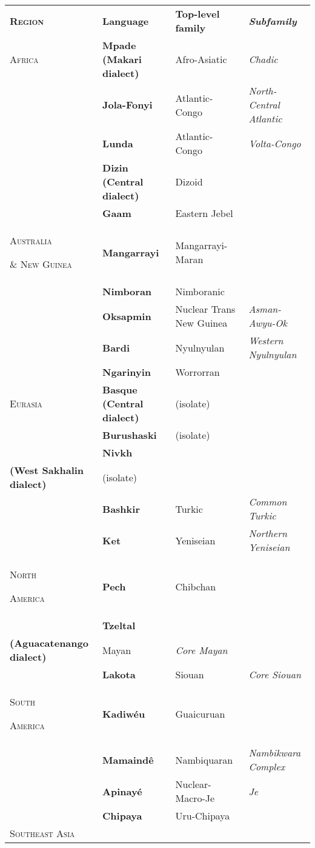 \begin{table}
\begin{tabularx}{\textwidth}{XXXX}
\lsptoprule

\textbf{\textsc{Region}} & \textbf{Language} & \textbf{Top-level family} & \textbf{\textit{Subfamily}}\\
\textsc{Africa} & \textbf{Mpade (Makari dialect)} & Afro-Asiatic & \textit{Chadic}\\
\hhline{-~~~} & \textbf{Jola-Fonyi} & Atlantic-Congo & \textit{North-Central Atlantic}\\
& \textbf{Lunda} & Atlantic-Congo & \textit{Volta-Congo}\\
& \textbf{Dizin (Central dialect)} & Dizoid & \\
& \textbf{Gaam} & Eastern Jebel & \\
\textsc{Australia} 

\textsc{\&} \textsc{New} \textsc{Guinea} & \textbf{Mangarrayi} & Mangarrayi-Maran & \\
\hhline{-~~~} & \textbf{Nimboran} & Nimboranic & \\
& \textbf{Oksapmin} & Nuclear Trans New Guinea & \textit{Asman-Awyu-Ok}\\
& \textbf{Bardi} & Nyulnyulan & \textit{Western Nyulnyulan}\\
& \textbf{Ngarinyin} & Worrorran & \\
\textsc{Eurasia} & \textbf{Basque (Central dialect)} & (isolate) & \\
\hhline{-~~~} & \textbf{Burushaski} & (isolate) & \\
& \textbf{Nivkh} \\
\textbf{(West Sakhalin dialect)} & (isolate) & \\
& \textbf{Bashkir} & Turkic & \textit{Common Turkic}\\
& \textbf{Ket} & Yeniseian & \textit{Northern Yeniseian}\\
\textsc{North} 

\textsc{America} & \textbf{Pech} & Chibchan & \\
\hhline{-~~~} & \textbf{Tzeltal} \\
\textbf{(Aguacatenango dialect)} & Mayan & \textit{Core Mayan}\\
& \textbf{Lakota} & Siouan & \textit{Core Siouan}\\
\textsc{South} 

\textsc{America} & \textbf{Kadiwéu} & Guaicuruan & \\
\hhline{-~~~} & \textbf{Mamaindê} & Nambiquaran & \textit{Nambikwara Complex}\\
& \textbf{Apinayé} & Nuclear-Macro-Je & \textit{Je}\\
& \textbf{Chipaya} & Uru-Chipaya & \\
\textsc{Southeast} \textsc{Asia} 


\end{tabularx}
\end{table}

